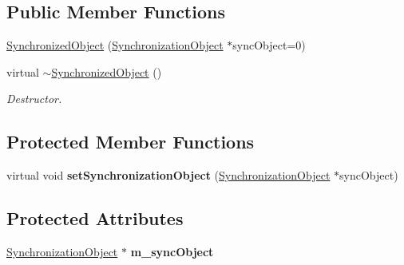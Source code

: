 \subsection*{Public Member Functions}
\begin{DoxyCompactItemize}
\item 
\hyperlink{class_synchronized_object_a9ae8017720af72aac92964f23b55d6f1}{Synchronized\+Object} (\hyperlink{class_synchronized_object_1_1_synchronization_object}{Synchronization\+Object} $\ast$sync\+Object=0)
\item 
virtual \hyperlink{class_synchronized_object_ae2c081d2e252b35a49edbf887579cfe0}{$\sim$\+Synchronized\+Object} ()\hypertarget{class_synchronized_object_ae2c081d2e252b35a49edbf887579cfe0}{}\label{class_synchronized_object_ae2c081d2e252b35a49edbf887579cfe0}

\begin{DoxyCompactList}\small\item\em Destructor. \end{DoxyCompactList}\end{DoxyCompactItemize}
\subsection*{Protected Member Functions}
\begin{DoxyCompactItemize}
\item 
virtual void {\bfseries set\+Synchronization\+Object} (\hyperlink{class_synchronized_object_1_1_synchronization_object}{Synchronization\+Object} $\ast$sync\+Object)\hypertarget{class_synchronized_object_a72f0856ba79569fea9907916e085c555}{}\label{class_synchronized_object_a72f0856ba79569fea9907916e085c555}

\end{DoxyCompactItemize}
\subsection*{Protected Attributes}
\begin{DoxyCompactItemize}
\item 
\hyperlink{class_synchronized_object_1_1_synchronization_object}{Synchronization\+Object} $\ast$ {\bfseries m\+\_\+sync\+Object}\hypertarget{class_synchronized_object_a51605ed5ba10c06e795f21a98ea5ef37}{}\label{class_synchronized_object_a51605ed5ba10c06e795f21a98ea5ef37}

\end{DoxyCompactItemize}
